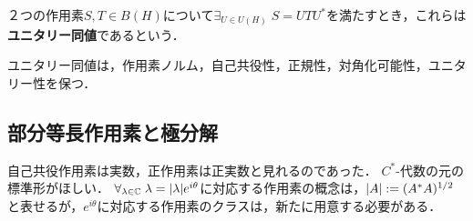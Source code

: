 \documentclass[uplatex,dvipdfmx]{jsreport}
\begin{document}
\begin{definition}\label{def-unitary-equivalent}
    ２つの作用素$S,T\in B(H)$について$\exists_{U\in U(H)}\;S=UTU^*$を満たすとき，これらは\textbf{ユニタリー同値}であるという．
\end{definition}

\begin{lemma}
    ユニタリー同値は，作用素ノルム，自己共役性，正規性，対角化可能性，ユニタリー性を保つ．
\end{lemma}

\subsection{部分等長作用素と極分解}

\begin{tcolorbox}[colframe=ForestGreen, colback=ForestGreen!10!white,breakable,colbacktitle=ForestGreen!40!white,coltitle=black,fonttitle=\bfseries\sffamily,
title=]
    自己共役作用素は実数，正作用素は正実数と見れるのであった．
    $C^*$-代数の元の標準形がほしい．
    $\forall_{\lambda\in\mathbb{C}}\;\lambda=\lvert\lambda\rvert e^{i\theta}$に対応する作用素の概念は，$\lvert A\rvert:=(A^*A)^{1/2}$と表せるが，$e^{i\theta}$に対応する作用素のクラスは，新たに用意する必要がある．
\end{tcolorbox}
\end{document}

